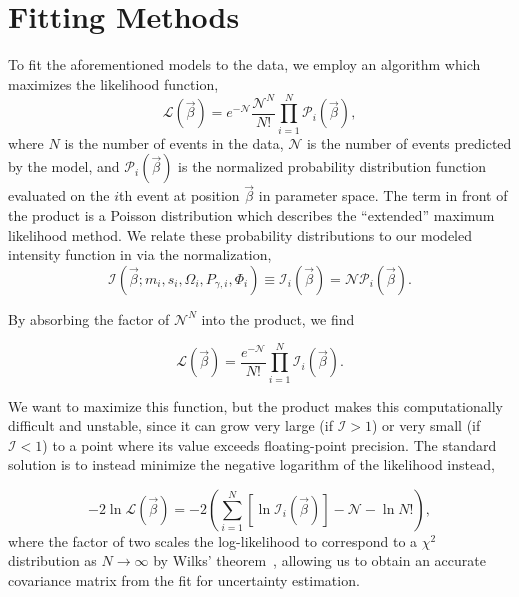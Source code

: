 \section{Fitting Methods}\label{sec:fitting-methods}

To fit the aforementioned models to the data, we employ an algorithm which maximizes the likelihood function,
\begin{equation}
  \mathcal{L}(\vec{\beta}) = e^{-\mathcal{N}} \frac{\mathcal{N}^N}{N!} \prod_{i=1}^{N} \mathcal{P}_i(\vec{\beta}),
  \label{eq:likelihood}
\end{equation}
where $N$ is the number of events in the data, $\mathcal{N}$ is the number of events predicted by the model, and $\mathcal{P}_i(\vec{\beta})$ is the normalized probability distribution function evaluated on the $i$th event at position $\vec{\beta}$ in parameter space. The term in front of the product is a Poisson distribution which describes the ``extended'' maximum likelihood method. We relate these probability distributions to our modeled intensity function in  via the normalization,
\begin{equation}
  \mathcal{I}(\vec{\beta}; m_i, s_i, \Omega_i, P_{\gamma, i}, \Phi_i) \equiv \mathcal{I}_i(\vec{\beta}) = \mathcal{N}\mathcal{P}_i(\vec{\beta}).
\end{equation}

By absorbing the factor of $\mathcal{N}^N$ into the product, we find

\begin{equation}
  \mathcal{L}(\vec{\beta}) = \frac{e^{-\mathcal{N}}}{N!} \prod_{i=1}^{N} \mathcal{I}_i(\vec{\beta}).
\end{equation}

We want to maximize this function, but the product makes this computationally difficult and unstable, since it can grow very large (if $\mathcal{I} > 1$) or very small (if $\mathcal{I} < 1$) to a point where its value exceeds floating-point precision. The standard solution is to instead minimize the negative logarithm of the likelihood instead,

\begin{equation}
  -2 \ln \mathcal{L}(\vec{\beta}) = -2 \left(\sum_{i=1}^{N} \left[\ln \mathcal{I}_i(\vec{\beta})\right] - \mathcal{N} - \ln N! \right),
\end{equation}
where the factor of two scales the log-likelihood to correspond to a $\chi^2$ distribution as $N \to \infty$ by Wilks' theorem~\cite{Wilks1938}, allowing us to obtain an accurate covariance matrix from the fit for uncertainty estimation.


